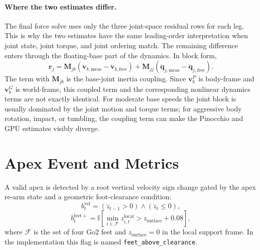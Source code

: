 \documentclass[11pt, a4paper]{article}
\begin{document}
\paragraph{Where the two estimates differ.}
The final force solve uses only the three joint-space residual rows for each
leg. This is why the two estimates have the same leading-order interpretation
when joint state, joint torque, and joint ordering match. The remaining
difference enters through the floating-base part of the dynamics. In block
form,
\begin{equation}
    \bm{r}_j
    =
    \bm{M}_{jb}
    \left(
        \dot{\bm{v}}_{b,\mathrm{meas}}
        -
        \dot{\bm{v}}_{b,\mathrm{free}}
    \right)
    +
    \bm{M}_{jj}
    \left(
        \ddot{\bm{q}}_{j,\mathrm{meas}}
        -
        \ddot{\bm{q}}_{j,\mathrm{free}}
    \right).
\end{equation}
The term with $\bm{M}_{jb}$ is the base-joint inertia coupling. Since
$\bm{v}^{P}_b$ is body-frame and $\bm{v}^{G}_b$ is world-frame, this coupled
term and the corresponding nonlinear dynamics terms are not exactly identical.
For moderate base speeds the joint block is usually dominated by the joint
motion and torque terms; for aggressive body rotation, impact, or tumbling, the
coupling term can make the Pinocchio and GPU estimates visibly diverge.

\section{Apex Event and Metrics}

A valid apex is detected by a root vertical velocity sign change gated by the
apex re-arm state and a geometric foot-clearance condition:
\begin{equation}
    b^{\mathrm{vel}}_t =
    (\dot{z}_{t-1} > 0)
    \wedge (\dot{z}_{t} \le 0),
\end{equation}
\begin{equation}
    b^{\mathrm{feet+}}_t =
    \mathbb{I}
    \left[
        \min_{i\in\mathcal{F}} z^{\mathrm{local}}_{i,t}
        > z_{\mathrm{surface}} + 0.08
    \right],
\end{equation}
where $\mathcal{F}$ is the set of four Go2 feet and $z_{\mathrm{surface}}=0$ in
the local support frame. In the implementation this flag is named
\texttt{feet\_above\_clearance}.
\end{document}
